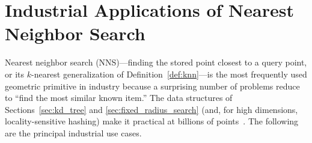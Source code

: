 \section{Industrial Applications of Nearest Neighbor Search}
\label{sec:nn_applications}

Nearest neighbor search (NNS)---finding the stored point closest to a query
point, or its $k$-nearest generalization of Definition~\ref{def:knn}---is the
most frequently used geometric primitive in industry because a surprising
number of problems reduce to ``find the most similar known item.'' The data
structures of Sections~\ref{sec:kd_tree} and \ref{sec:fixed_radius_search}
(and, for high dimensions, locality-sensitive hashing) make it practical at
billions of points~\cite{bentley1975,samet2006}. The following are the
principal industrial use cases.

